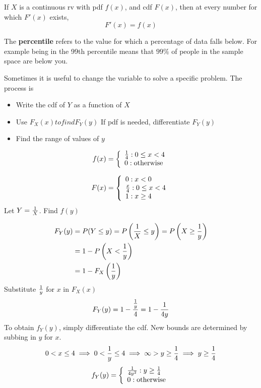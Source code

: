 \documentclass[english, 12pt]{article}
\begin{document}
\begin{note}
If $X$ is a continuous rv with pdf $f(x)$, and cdf $F(x)$, then at every number for which $F'(x)$ exists,
\[F'(x) = f(x)\]
\end{note}

\begin{defn}
The \textbf{percentile} refers to the value for which a percentage of data falls below. For example being in the 99th percentile means that $99\%$ of people in the sample space are below you.
\end{defn}

\begin{note}
Sometimes it is useful to change the variable to solve a specific problem. The process is
\begin{itemize}
\item Write the cdf of $Y$ as a function of $X$
\item Use $F_X(x) to find F_Y(y)$ If pdf is needed, differentiate $F_Y(y)$
\item Find the range of values of $y$
\end{itemize}
\end{note}

\begin{exmp}
\begin{displaymath}
   f(x) = \left\{
     \begin{array}{lr}
       \frac{1}{4} : 0 \leq x < 4 \\
       0 : \text{otherwise}
     \end{array}
   \right.
\end{displaymath}

\begin{displaymath}
   F(x) = \left\{
     \begin{array}{lr}
        0: x < 0 \\
       \frac{x}{4} : 0 \leq x < 4 \\
       1 : x \geq 4
     \end{array}
   \right.
\end{displaymath}
Let $Y = \frac{1}{X}$. Find $f(y)$
\begin{sol}

\begin{align*}
F_Y(y) &= P(Y \leq y) = P\left(\frac{1}{X} \leq y\right) = P \left(X \geq \frac{1}{y}\right) \\
&= 1 - P\left(X < \frac{1}{y}\right) \\
&= 1 - F_X\left(\frac{1}{y}\right)
\end{align*}
Substitute $\frac{1}{y}$ for $x$ in $F_X(x)$
\[F_Y(y) = 1 - \frac{\frac{1}{y}}{4} = 1 - \frac{1}{4y}\]
To obtain $f_Y(y)$, simply differentiate the cdf. New bounds are determined by subbing in $y$ for $x$.
\[0 < x \leq 4 \implies 0 < \frac{1}{y} \leq 4 \implies \infty > y \geq \frac{1}{4} \implies y \geq \frac{1}{4} \]
\begin{displaymath}
   f_Y(y) = \left\{
     \begin{array}{lr}
       \frac{1}{4y^2} : y \geq \frac{1}{4} \\
       0 : \text{otherwise}
     \end{array}
   \right.
\end{displaymath}
\end{sol}
\end{exmp}
\end{document}
